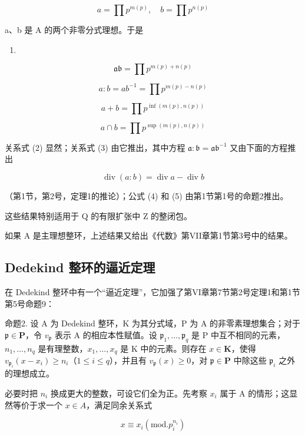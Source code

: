 \[
a = \prod p ^ {m (p)}, \quad b = \prod p ^ {n (p)}
\]

a、b 是 A 的两个非零分式理想。于是

\begin{enumerate}
\def\labelenumi{(\arabic{enumi})}
\setcounter{enumi}{1}
\tightlist
\item
\end{enumerate}

\[
\mathfrak {a b} = \prod p ^ {m (p) + n (p)}\tag{3}
\]

\[
a: b = a b ^ {- 1} = \prod p ^ {m (p) - n (p)}\tag{4}
\]

\[
a + b = \prod p ^ {\inf (m (p), n (p))}\tag{5}
\]

\[
a \cap b = \prod p ^ {\sup (m (p), n (p))}
\]

关系式 (2) 显然；关系式 (3) 由它推出，其中方程 \(\mathfrak{a} \colon \mathfrak{b} = \mathfrak{ab}^{-1}\) 又由下面的方程推出

\[
\operatorname{div} (a: b) = \operatorname{div} a - \operatorname{div} b
\]

（第1节，第2号，定理1的推论）；公式 (4) 和 (5) 由第1节第1号的命题2推出。

这些结果特别适用于 Q 的有限扩张中 Z 的整闭包。

如果 A 是主理想整环，上述结果又给出《代数》第VII章第1节第3号中的结果。

\subsection{Dedekind 整环的逼近定理}

在 Dedekind 整环中有一个“逼近定理”，它加强了第VI章第7节第2号定理1和第1节第5号命题9：

命题2. 设 A 为 Dedekind 整环，K 为其分式域，P 为 A 的非零素理想集合；对于 \(\mathfrak{p} \in \mathbf{P}\)，令 \(v_{\mathfrak{p}}\) 表示 A 的相应本性赋值。设 \(\mathfrak{p}_1, \ldots, \mathfrak{p}_q\) 是 P 中互不相同的元素，\(n_1, \ldots, n_q\) 是有理整数，\(x_1, \ldots, x_q\) 是 K 中的元素。则存在 \(x \in \mathbf{K}\)，使得 \(v_{\mathfrak{p}_i}(x - x_i) \geqslant n_i\)（\(1 \leqslant i \leqslant q\)），并且有 \(v_{\mathfrak{p}}(x) \geqslant 0\)，对 \(\mathfrak{p} \in \mathbf{P}\) 中除这些 \(\mathfrak{p}_i\) 之外的理想成立。

必要时把 \(n_{i}\) 换成更大的整数，可设它们全为正。先考察 \(x_{i}\) 属于 A 的情形；这显然等价于求一个 \(x \in A\)，满足同余关系式

\[
x \equiv x _ {i} (\mathrm{mod.} p _ {i} ^ {n _ {i}})
\]

